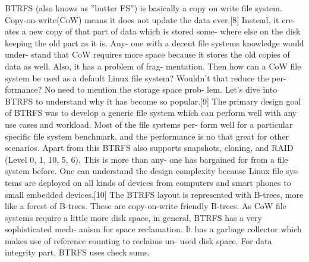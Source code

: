 

BTRFS (also knows as ”butter FS”) is basically a copy on write file system. Copy-on-write(CoW) means it does not update the data ever.[8] Instead, it cre-
ates a new copy of that part of data which is stored some-
where else on the disk keeping the old part as it is. Any-
one with a decent file systems knowledge would under-
stand that CoW requires more space because it stores the
old copies of data as well. Also, it has a problem of frag-
mentation. Then how can a CoW file system be used as a
default Linux file system? Wouldn’t that reduce the per-
formance? No need to mention the storage space prob-
lem. Let’s dive into BTRFS to understand why it has
become so popular.[9]
The primary design goal of BTRFS was to develop
a generic file system which can perform well with any
use cases and workload. Most of the file systems per-
form well for a particular specific file system benchmark,
and the performance is no that great for other scenarios.
Apart from this BTRFS also supports snapshots, cloning,
and RAID (Level 0, 1, 10, 5, 6). This is more than any-
one has bargained for from a file system before. One can
understand the design complexity because Linux file sys-
tems are deployed on all kinds of devices from computers
and smart phones to small embedded devices.[10]
The BTRFS layout is represented with B-trees, more
like a forest of B-trees. These are copy-on-write friendly
B-trees. As CoW file systems require a little more disk
space, in general, BTRFS has a very sophisticated mech-
anism for space reclamation. It has a garbage collector
which makes use of reference counting to reclaims un-
used disk space. For data integrity part, BTRFS uses
check sums.




